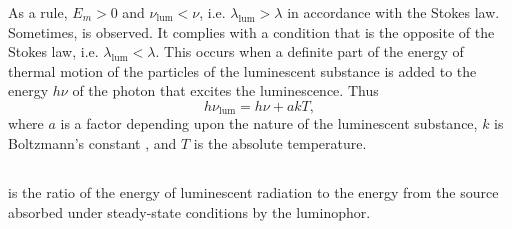 As a rule, $E_{m} > 0$ and $\nu_{\mathrm{lum}} < \nu$, i.e.  $\lambda_{\mathrm{lum}} > \lambda$ in accordance with the Stokes law. Sometimes,  is observed. It complies with a condition that is the opposite of
the Stokes law, i.e. $\lambda_{\mathrm{lum}} < \lambda$. This occurs when a definite part of the energy of thermal motion of the particles of the luminescent substance is added to the energy $h \nu$ of the photon that excites the luminescence. Thus
\begin{equation*}%
h \nu_{\mathrm{lum}} = h \nu+ akT,
\end{equation*}
where $a$ is a factor depending upon the nature of the luminescent substance, $k$ is Boltzmann's constant , and $T$ is the absolute temperature.

\subsection{}\label{39.7.6}  is the ratio of the energy of luminescent radiation to the energy from the source absorbed under steady-state conditions by the luminophor.

